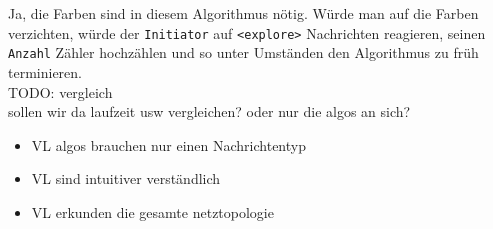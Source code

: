 Ja, die Farben sind in diesem Algorithmus nötig. Würde man auf die Farben
verzichten, würde der \verb+Initiator+ auf \verb+<explore>+ Nachrichten
reagieren, seinen \verb+Anzahl+ Zähler hochzählen und so unter Umständen den
Algorithmus zu früh terminieren. \\
TODO: vergleich \\
sollen wir da laufzeit usw vergleichen? oder nur die algos an sich?
\begin{itemize}
  \item VL algos brauchen nur einen Nachrichtentyp
  \item VL sind intuitiver verständlich
  \item VL erkunden die gesamte netztopologie
\end{itemize}
